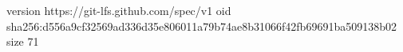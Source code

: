 version https://git-lfs.github.com/spec/v1
oid sha256:d556a9cf32569ad336d35e806011a79b74ae8b31066f42fb69691ba509138b02
size 71
